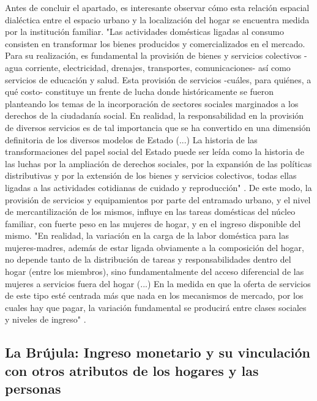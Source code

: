 Antes de concluir el apartado, es interesante observar cómo esta relación espacial dialéctica entre el espacio urbano y la localización del hogar se encuentra medida por la institución familiar. "Las actividades domésticas ligadas al consumo consisten en transformar los bienes producidos y comercializados en el mercado. Para su realización, es fundamental la provisión de bienes y servicios colectivos -agua corriente, electricidad, drenajes, transportes, comunicaciones- así como servicios de educación y salud. Esta provisión de servicios -cuáles, para quiénes, a qué costo- constituye un frente de lucha donde históricamente se fueron planteando los temas de la incorporación de sectores sociales marginados a los derechos de la ciudadanía social. En realidad, la responsabilidad en la provisión de diversos servicios es de tal importancia que se ha convertido en una dimensión definitoria de los diversos modelos de Estado (...) La historia de las transformaciones del papel social del Estado puede ser leída como la historia de las luchas por la ampliación de derechos sociales, por la expansión de las políticas distributivas y por la extensión de los bienes y servicios colectivos, todas ellas ligadas a las actividades cotidianas de cuidado y reproducción" \cite[p.~91]{jelin}. De este modo, la provisión de servicios y equipamientos por parte del entramado urbano, y el nivel de mercantilización de los mismos, influye en las tareas domésticas del núcleo familiar, con fuerte peso en las mujeres de hogar, y en el ingreso disponible del mismo. "En realidad, la variación en la carga de la labor doméstica para las mujeres-madres, además de estar ligada obviamente a la composición del hogar, no depende tanto de la distribución de tareas y responsabilidades dentro del hogar (entre los miembros), sino fundamentalmente del acceso diferencial de las mujeres a servicios fuera del hogar (...) En la medida en que la oferta de servicios de este tipo esté centrada más que nada en los mecanismos de mercado, por los cuales hay que pagar, la variación fundamental se producirá entre clases sociales y niveles de ingreso" \cite[p.~97]{jelin}.

	
\subsection{La Brújula: Ingreso monetario y su vinculación con otros atributos de los hogares y las personas}
	
